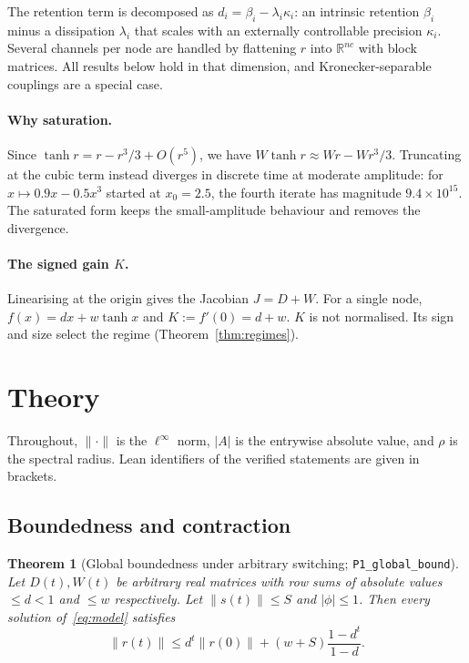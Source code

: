 \documentclass[11pt]{article}
\newtheorem{theorem}{Theorem}
\theoremstyle{definition}
\theoremstyle{remark}
\newcommand{\lean}[1]{\texttt{\small #1}}
\newcommand{\R}{\mathbb{R}}
\begin{document}
The retention term is decomposed as $d_i=\beta_i-\lambda_i\kappa_i$: an intrinsic retention $\beta_i$ minus
a dissipation $\lambda_i$ that scales with an externally controllable precision $\kappa_i$. Several
channels per node are handled by flattening $r$ into $\R^{nc}$ with block matrices. All results below hold
in that dimension, and Kronecker-separable couplings are a special case.

\paragraph{Why saturation.} Since $\tanh r=r-r^3/3+O(r^5)$, we have $W\tanh r\approx Wr-Wr^3/3$. Truncating
at the cubic term instead diverges in discrete time at moderate amplitude: for $x\mapsto0.9x-0.5x^3$
started at $x_0=2.5$, the fourth iterate has magnitude $9.4\times10^{15}$. The saturated form keeps the small-amplitude behaviour and removes the divergence.

\paragraph{The signed gain $K$.} Linearising at the origin gives the Jacobian $J=D+W$. For a single node,
$f(x)=dx+w\tanh x$ and $K:=f'(0)=d+w$. $K$ is not normalised. Its sign and size select the regime
(Theorem~\ref{thm:regimes}).

\section{Theory}\label{sec:theory}

Throughout, $\|\cdot\|$ is the $\ell^\infty$ norm, $|A|$ is the entrywise absolute value, and
$\rho$ is the spectral radius. Lean identifiers of the verified statements are given in brackets.

\subsection{Boundedness and contraction}

\begin{theorem}[Global boundedness under arbitrary switching; \lean{P1\_global\_bound}]\label{thm:bound}
Let $D(t),W(t)$ be arbitrary real matrices with row sums of absolute values $\le d<1$ and $\le w$
respectively. Let $\|s(t)\|\le S$ and $|\phi|\le 1$. Then every solution of~\eqref{eq:model} satisfies
\[
  \|r(t)\|\le d^t\|r(0)\|+(w+S)\frac{1-d^t}{1-d}.
\]
\end{theorem}
\end{document}
